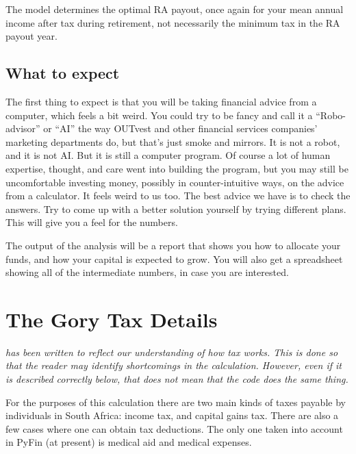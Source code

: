 \documentclass[a4paper, justified]{tufte-handout}
\begin{document}
The model determines the optimal RA payout, once again for your mean annual income after tax during retirement, not necessarily the minimum tax in the RA payout year.

\subsection{What to expect}
The first thing to expect is that you will be taking financial advice from a computer, which feels a bit weird. You could try to be fancy and call it a ``Robo-advisor'' or ``AI'' the way OUTvest and other financial services companies' marketing departments do, but that's just smoke and mirrors. It is not a robot, and it is not AI. But it is still a computer program. Of course a lot of human expertise, thought, and care went into building the program, but you may still be uncomfortable investing money, possibly in counter-intuitive ways, on the advice from a calculator. It feels weird to us too. The best advice we have is to check the answers. Try to come up with a better solution yourself by trying different plans. This will give you a feel for the numbers.

The output of the analysis will be a report that shows you how to allocate your funds, and how your capital is expected to grow. You will also get a spreadsheet showing all of the intermediate numbers, in case you are interested.

\newpage
\section{The Gory Tax Details}

\textit{ has been written to reflect our understanding of how tax works. This is done so that the reader may identify shortcomings in the calculation. However, even if it is described correctly below, that does not mean that the code does the same thing.}

For the purposes of this calculation there are two main kinds of taxes payable by individuals in South Africa: income tax, and capital gains tax. There are also a few cases where one can obtain tax deductions. The only one taken into account in PyFin (at present) is medical aid and medical expenses.
\end{document}
